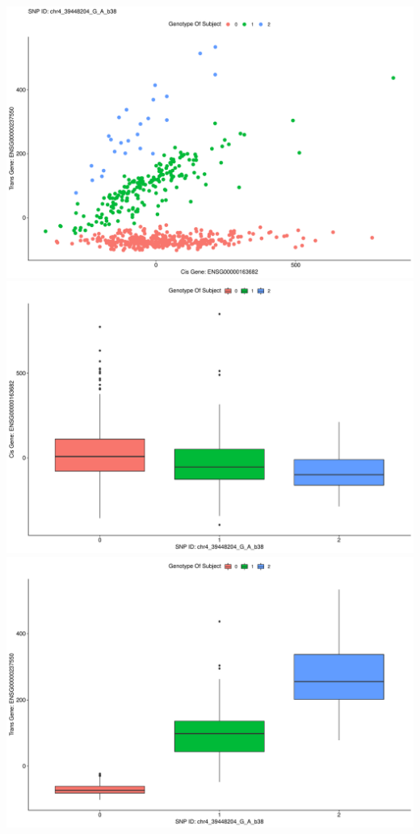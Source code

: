 \documentclass[
]{article}
\begin{document}
\includegraphics{12_15_2021_GMAC_plots_all_trios_files/figure-latex/unnamed-chunk-9-1.pdf}
\includegraphics{12_15_2021_GMAC_plots_all_trios_files/figure-latex/unnamed-chunk-9-2.pdf}
\includegraphics{12_15_2021_GMAC_plots_all_trios_files/figure-latex/unnamed-chunk-9-3.pdf}
\end{document}
